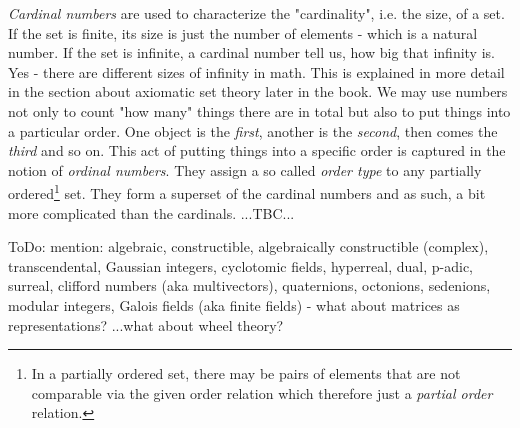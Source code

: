 \medskip
\emph{Cardinal numbers} are used to characterize the "cardinality", i.e. the size, of a set. If the set is finite, its size is just the number of elements - which is a natural number. If the set is infinite, a cardinal number tell us, how big that infinity is. Yes - there are different sizes of infinity in math. This is explained in more detail in the section about axiomatic set theory later in the book. We may use numbers not only to count "how many" things there are in total but also to put things into a particular order. One object is the \emph{first}, another is the \emph{second}, then comes the \emph{third} and so on. This act of putting things into a specific order is captured in the notion of \emph{ordinal numbers}. They assign a so called \emph{order type} to any partially ordered\footnote{In a partially ordered set, there may be pairs of elements that are not comparable via the given order relation which therefore just a \emph{partial order} relation.} set. They form a superset of the cardinal numbers and as such, a bit more complicated than the cardinals. ...TBC...

\medskip
ToDo: mention: algebraic, constructible, algebraically constructible (complex), transcendental, Gaussian integers, cyclotomic fields, hyperreal, dual, p-adic, surreal, clifford numbers (aka multivectors), quaternions, octonions, sedenions, modular integers, Galois fields (aka finite fields) - what about matrices as representations? ...what about wheel theory?






